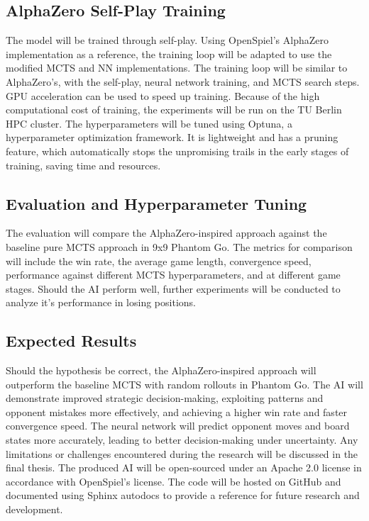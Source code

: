 \documentclass[12pt,oneside,openright]{article}
\begin{document}
\subsection{AlphaZero Self-Play Training}

The model will be trained through self-play. Using OpenSpiel's AlphaZero implementation as a reference, the training loop will be adapted to use the modified MCTS and NN implementations. The training loop will be similar to AlphaZero's, with the self-play, neural network training, and MCTS search steps.
GPU acceleration can be used to speed up training. Because of the high computational cost of training, the experiments will be run on the TU Berlin HPC cluster. The hyperparameters will be tuned using Optuna, a hyperparameter optimization framework. It is lightweight and has a pruning feature, which automatically stops the unpromising trails in the early stages of training, saving time and resources.


\subsection{Evaluation and Hyperparameter Tuning}

The evaluation will compare the AlphaZero-inspired approach against the baseline pure MCTS approach in 9x9 Phantom Go. The metrics for comparison will include the win rate, the average game length, convergence speed, performance against different MCTS hyperparameters, and at different game stages. Should the AI perform well, further experiments will be conducted to analyze it's performance in losing positions.
\subsection{Expected Results}
Should the hypothesis be correct, the AlphaZero-inspired approach will outperform the baseline MCTS with random rollouts in Phantom Go. The AI will demonstrate improved strategic decision-making, exploiting patterns and opponent mistakes more effectively, and achieving a higher win rate and faster convergence speed. The neural network will predict opponent moves and board states more accurately, leading to better decision-making under uncertainty.
Any limitations or challenges encountered during the research will be discussed in the final thesis. The produced AI will be open-sourced under an Apache 2.0 license in accordance with OpenSpiel's license. The code will be hosted on GitHub and documented using Sphinx autodocs to provide a reference for future research and development.
\end{document}
